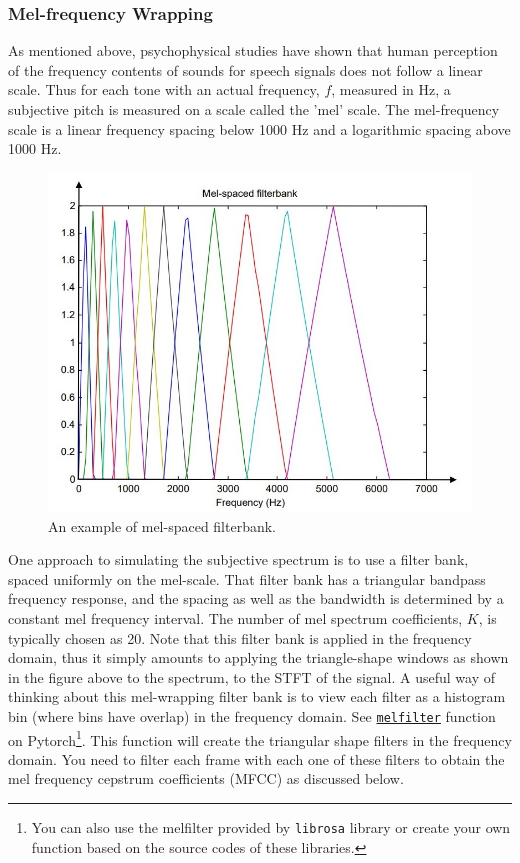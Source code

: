 \documentclass{article}
\begin{document}
\subsubsection{Mel-frequency Wrapping}
As mentioned above, psychophysical studies have shown that human perception of the frequency contents of sounds for speech signals does not follow a linear scale. Thus for each tone with an actual frequency, $f$, measured in Hz, a subjective pitch is measured on a scale called the 'mel' scale.  The mel-frequency scale is a linear frequency spacing below 1000 Hz and a logarithmic spacing above 1000 Hz.  

\begin{figure}[htb]
    \centering
    \includegraphics[width=.8\textwidth]{Fig2.jpg}
    \caption{An example of mel-spaced filterbank.}
\end{figure}

One approach to simulating the subjective spectrum is to use a filter bank, spaced uniformly on the mel-scale.  That filter bank has a triangular bandpass frequency response, and the spacing as well as the bandwidth is determined by a constant mel frequency interval.  The number of mel spectrum coefficients, $K$, is typically chosen as 20.  Note that this filter bank is applied in the frequency domain, thus it simply amounts to applying the triangle-shape windows as shown in the figure above to the spectrum, to the STFT of the signal.  A useful way of thinking about this mel-wrapping filter bank is to view each filter as a histogram bin (where bins have overlap) in the frequency domain. See \href{https://pytorch.org/audio/main/tutorials/audio_feature_extractions_tutorial.html#mel-filter-bank}{\texttt{melfilter}} function on Pytorch\footnote{You can also use the melfilter provided by \texttt{librosa} library or create your own function based on the source codes of these libraries.}. This function will create the triangular shape filters in the frequency domain. 
You need to filter each frame with each one of these filters to obtain the mel frequency cepstrum coefficients (MFCC) as discussed below.
\end{document}
